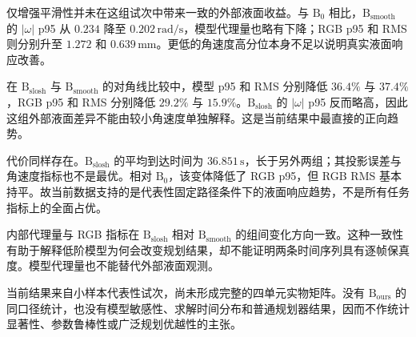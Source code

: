 仅增强平滑性并未在这组试次中带来一致的外部液面收益。与 $\mathrm{B}_{0}$ 相比，$\mathrm{B}_{\mathrm{smooth}}$ 的 $|\omega|$ p95 从 $0.234$ 降至 $0.202\,\mathrm{rad/s}$，模型代理量也略有下降；RGB p95 和 RMS 则分别升至 $1.272$ 和 $0.639\,\mathrm{mm}$。更低的角速度高分位本身不足以说明真实液面响应改善。

在 $\mathrm{B}_{\mathrm{slosh}}$ 与 $\mathrm{B}_{\mathrm{smooth}}$ 的对角线比较中，模型 p95 和 RMS 分别降低 $36.4\%$ 与 $37.4\%$，RGB p95 和 RMS 分别降低 $29.2\%$ 与 $15.9\%$。$\mathrm{B}_{\mathrm{slosh}}$ 的 $|\omega|$ p95 反而略高，因此这组外部液面差异不能由较小角速度单独解释。这是当前结果中最直接的正向趋势。

代价同样存在。$\mathrm{B}_{\mathrm{slosh}}$ 的平均到达时间为 $36.851\,\mathrm{s}$，长于另外两组；其投影误差与角速度指标也不是最优。相对 $\mathrm{B}_{0}$，该变体降低了 RGB p95，但 RGB RMS 基本持平。故当前数据支持的是代表性固定路径条件下的液面响应趋势，不是所有任务指标上的全面占优。

内部代理量与 RGB 指标在 $\mathrm{B}_{\mathrm{slosh}}$ 相对 $\mathrm{B}_{\mathrm{smooth}}$ 的组间变化方向一致。这种一致性有助于解释低阶模型为何会改变规划结果，却不能证明两条时间序列具有逐帧保真度。模型代理量也不能替代外部液面观测。

当前结果来自小样本代表性试次，尚未形成完整的四单元实物矩阵。没有 $\mathrm{B}_{\mathrm{ours}}$ 的同口径统计，也没有模型敏感性、求解时间分布和普通规划器结果，因而不作统计显著性、参数鲁棒性或广泛规划优越性的主张。

\FloatBarrier
